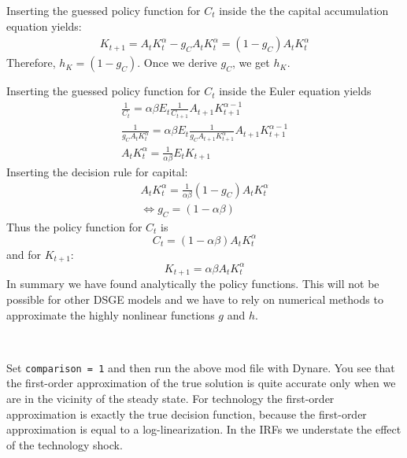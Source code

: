 \begin{Solution}{3}
	Inserting the guessed policy function for $C_t$ inside the the capital accumulation equation yields:
	\begin{align*}
	K_{t+1} = A_{t}K_{t}^\alpha - g_C A_t K_t^\alpha = (1-g_C) A_t K_t^\alpha
	\end{align*}
	Therefore, $h_K=(1-g_C)$. Once we derive $g_C$, we get  $h_K$.

	Inserting the guessed policy function for $C_t$ inside the Euler equation yields
	\begin{align*}
	\frac{1}{C_t} = \alpha \beta E_t \frac{1}{C_{t+1}}A_{t+1} K_{t+1}^{\alpha-1}\\
	\frac{1}{g_C A_t K_t^\alpha} = \alpha \beta E_t \frac{1}{g_C A_{t+1} K_{t+1}^\alpha}A_{t+1} K_{t+1}^{\alpha-1}\\
	A_t K_t^\alpha = \frac{1}{\alpha \beta} E_t K_{t+1}
	\end{align*}
	Inserting the decision rule for capital:
	\begin{align*}
		A_t K_t^\alpha = \frac{1}{\alpha \beta} (1-g_C)A_t K_t^\alpha\\
		\Leftrightarrow g_C = (1-\alpha \beta)
	\end{align*}
	Thus the policy function for $C_t$ is
	$$ C_t = (1-\alpha\beta) A_t K_t^\alpha$$
	and for $K_{t+1}$:
	$$ K_{t+1} = \alpha \beta A_t K_t^\alpha$$
	In summary we have found analytically the policy functions. This will not be possible for other DSGE models and we have to rely on numerical methods to approximate the highly nonlinear functions $g$ and $h$.
	
\end{Solution}
\begin{Solution}{4}
~
	
	
\end{Solution}
\begin{Solution}{5}
	Set \texttt{comparison = 1} and then run the above mod file with Dynare. You see that the first-order approximation of the true solution is quite accurate only when we are in the vicinity of the steady state. For technology the first-order approximation is exactly the true decision function, because the first-order approximation is equal to a log-linearization. In the IRFs we understate the effect of the technology shock.
	
\end{Solution}
